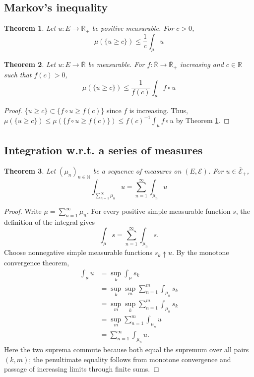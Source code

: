 \documentclass[11pt, a4paper, openany]{book}
\newtheorem{thm}{Theorem}\newtheorem{lem}{Lemma}\newtheorem{crl}{Corollary}
\theoremstyle{definition}
\newcommand{\er}{\overline{\mathbb{R}}}
\begin{document}
\subsection{Markov's inequality}
    \begin{thm}\label{Markov's inequality}
        Let $u:E\rightarrow\er_+$ be positive measurable. For $c>0$, %
        \[
            \mu(\{u\geqslant c\})\leqslant\frac{1}{c}\int_\mu u
        \]
    \end{thm}
    \begin{thm}\label{Markov's inequality, generalized}
        Let $u:E\rightarrow \er$ be measurable. For $f:\er\rightarrow\er_+$ increasing and $c\in\mathbb{R}$ such that $f(c)>0$,
        \[
            \mu(\{u\geqslant c\})\leqslant\frac{1}{f(c)}\int_\mu f\circ u
        \]
    \end{thm}
    \begin{proof}
        $\{u\geqslant c\}\subset \{f\circ u\geqslant f(c)\}$ since $f$ is increasing. Thus, $\mu(\{u\geqslant c\})\leqslant \mu(\{f\circ u\geqslant f(c)\})\leqslant f(c)^{-1}\int_\mu f\circ u$ by Theorem \ref{Markov's inequality}.
    \end{proof}
\subsection{Integration w.r.t. a series of measures}
    \begin{thm}\label{integration w.r.t. a series of measures}
        Let $(\mu_n)_{n\in\mathbb{N}}$ be a sequence of measures on $(E,\mathscr{E})$. For $u\in\overline{\mathscr{E}}_+$,
        \[
            \int_{\sum_{n=1}^\infty \mu_n} u = \sum_{n=1}^\infty \int_{\mu_n} u
        \]
    \end{thm}
    \begin{proof}
        Write $\mu=\sum_{n=1}^{\infty}\mu_n$. For every positive
        simple measurable function $s$, the definition of the integral gives
        \[
        \int_\mu s=\sum_{n=1}^{\infty}\int_{\mu_n}s.
        \]
        Choose nonnegative simple measurable functions $s_k\uparrow u$.
        By the monotone convergence theorem,
        \[
        \begin{aligned}
        \int_\mu u
        &=\sup_k\int_\mu s_k\\
        &=\sup_k\sup_m\sum_{n=1}^{m}\int_{\mu_n}s_k\\
        &=\sup_m\sup_k\sum_{n=1}^{m}\int_{\mu_n}s_k\\
        &=\sup_m\sum_{n=1}^{m}\int_{\mu_n}u\\
        &=\sum_{n=1}^{\infty}\int_{\mu_n}u.
        \end{aligned}
        \]
        Here the two suprema commute because both equal the supremum
        over all pairs $(k,m)$; the penultimate equality follows from
        monotone convergence and passage of increasing limits through
        finite sums.
    \end{proof}
\end{document}
